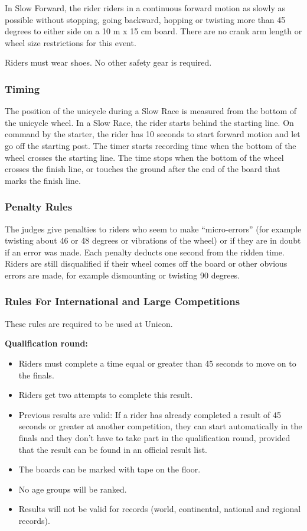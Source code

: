 In Slow Forward, the rider riders in a continuous forward motion as slowly as possible without stopping, going backward, hopping or twisting more than 45 degrees to either side on a 10 m x 15 cm board. There are no crank arm length or wheel size restrictions for this event. 

Riders must wear shoes. No other safety gear is required.

\subsubsection{Timing}
The position of the unicycle during a Slow Race is measured from the bottom of the unicycle wheel.
In a Slow Race, the rider starts behind the starting line. On command by the starter, the rider has 10 seconds to start forward motion and let go off the starting post.
The timer starts recording time when the bottom of the wheel crosses the starting line.
The time stops when the bottom of the wheel crosses the finish line, or touches the ground after the end of the board that marks the finish line. 


\subsubsection{Penalty Rules}
The judges give penalties to riders who seem to make ``micro-errors'' (for example twisting about 46 or 48 degrees or vibrations of the wheel) or if they are in doubt if an error was made. Each penalty deducts one second from the ridden time.
Riders are still disqualified if their wheel comes off the board or other obvious errors are made, for example dismounting or twisting 90 degrees.

\subsubsection{Rules For International and Large Competitions}
These rules are required to be used at Unicon.

\textbf{Qualification round:}
\begin{itemize}
\item Riders must complete a time equal or greater than 45 seconds to move on to the finals.
\item Riders get two attempts to complete this result.
\item Previous results are valid: If a rider has already completed a result of 45 seconds or greater at another competition, they can start automatically in the finals and they don't have to take part in the qualification round, provided that the result can be found in an official result list.
\item The boards can be marked with tape on the floor.
\item No age groups will be ranked. 
\item Results will not be valid for records (world, continental, national and regional records).
\end{itemize}


